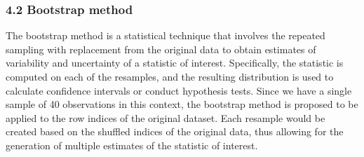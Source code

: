\documentclass[
]{article}
\newenvironment{Shaded}{\begin{snugshade}}{\end{snugshade}}
\newcommand{\DecValTok}[1]{\textcolor[rgb]{0.00,0.00,0.81}{#1}}
\newcommand{\FloatTok}[1]{\textcolor[rgb]{0.00,0.00,0.81}{#1}}
\newcommand{\FunctionTok}[1]{\textcolor[rgb]{0.00,0.00,0.00}{#1}}
\newcommand{\NormalTok}[1]{#1}
\newcommand{\OtherTok}[1]{\textcolor[rgb]{0.56,0.35,0.01}{#1}}
\newcommand{\SpecialCharTok}[1]{\textcolor[rgb]{0.00,0.00,0.00}{#1}}
\begin{document}
\begin{Shaded}
\end{Shaded}

\hypertarget{bootstrap-method}{%
\subsubsection{4.2 Bootstrap method}\label{bootstrap-method}}

The bootstrap method is a statistical technique that involves the
repeated sampling with replacement from the original data to obtain
estimates of variability and uncertainty of a statistic of interest.
Specifically, the statistic is computed on each of the resamples, and
the resulting distribution is used to calculate confidence intervals or
conduct hypothesis tests. Since we have a single sample of 40
observations in this context, the bootstrap method is proposed to be
applied to the row indices of the original dataset. Each resample would
be created based on the shuffled indices of the original data, thus
allowing for the generation of multiple estimates of the statistic of
interest.
\end{document}
